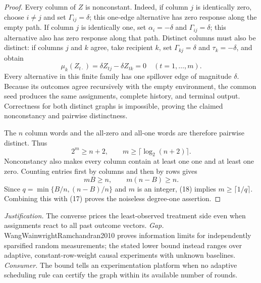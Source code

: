 \documentclass{article}
\begin{document}
\begin{proof}
Every column of \(Z\) is nonconstant.  Indeed, if column \(j\) is identically zero, choose \(i\ne j\) and set \(\Gamma_{ij}=\delta\); this one-edge alternative has zero response along the empty path.  If column \(j\) is identically one, set \(\alpha_i=-\delta\) and \(\Gamma_{ij}=\delta\); this alternative also has zero response along that path.  Distinct columns must also be distinct: if columns \(j\) and \(k\) agree, take recipient \(k\), set \(\Gamma_{kj}=\delta\) and \(\tau_k=-\delta\), and obtain
\[
 \mu_k(Z_{t\cdot})=\delta Z_{tj}-\delta Z_{tk}=0
 \quad(t=1,\ldots,m). \tag{16}
\]
Every alternative in this finite family has one spillover edge of magnitude \(\delta\).  Because its outcomes agree recursively with the empty environment, the common seed produces the same assignments, complete history, and terminal output.  Correctness for both distinct graphs is impossible, proving the claimed nonconstancy and pairwise distinctness.

The \(n\) column words and the all-zero and all-one words are therefore pairwise distinct.  Thus
\[
 2^m\ge n+2,
 \qquad m\ge\lceil\log_2(n+2)\rceil. \tag{17}
\]
Nonconstancy also makes every column contain at least one one and at least one zero.  Counting entries first by columns and then by rows gives
\[
 mB\ge n,
 \qquad m(n-B)\ge n. \tag{18}
\]
Since \(q=\min\{B/n,(n-B)/n\}\) and \(m\) is an integer, (18) implies \(m\ge\lceil1/q\rceil\).  Combining this with (17) proves the noiseless degree-one assertion.
\end{proof}
\par\smallskip\noindent \textit{Justification.} The converse prices the least-observed treatment side even when assignments react to all past outcome vectors. \textit{Gap.} WangWainwrightRamchandran2010 proves information limits for independently sparsified random measurements; the stated lower bound instead ranges over adaptive, constant-row-weight causal experiments with unknown baselines. \textit{Consumer.} The bound tells an experimentation platform when no adaptive scheduling rule can certify the graph within its available number of rounds.
\end{document}
